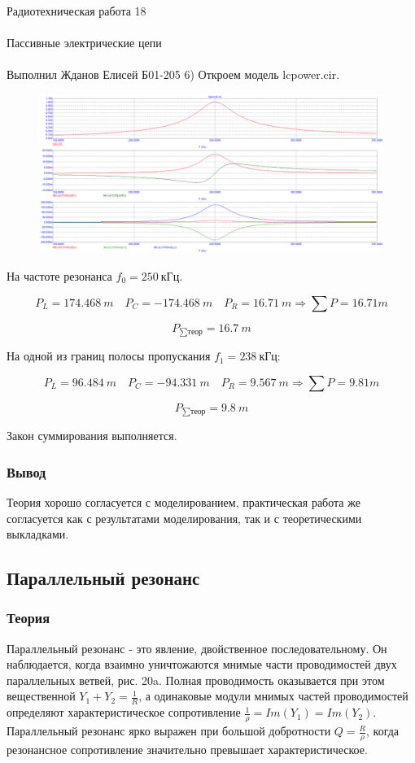 \documentclass{astroedu-lab}
\begin{document}
\begin{problem}{\huge Радиотехническая работа 18\\\\Пассивные электрические цепи\\\\Выполнил Жданов Елисей Б01-205}
6) Откроем модель lcpower.cir.

\begin{figure}[h!]
\centering
\includegraphics[scale=0.4]{lcpower.png}
\label{fig:Image1}
\end{figure} 

На частоте резонанса $f_0 = 250 \: \text{кГц}$.

\[P_L = 174.468 \: m \quad P_C = -174.468 \: m \quad P_R = 16.71 \: m \Rightarrow \sum P = 16.71 m\]

\[P_{\sum \text{теор}} = 16.7 \: m\]

На одной из границ полосы пропускания $f_1 = 238 \: \text{кГц}$:

\[P_L = 96.484 \: m \quad P_C = -94.331 \: m \quad P_R = 9.567 \: m \Rightarrow \sum P = 9.81 m\]

\[P_{\sum \text{теор}} = 9.8 \: m\]

Закон суммирования выполняется.

\subsubsection{Вывод}

Теория хорошо согласуется с моделированием, практическая работа же согласуется как с результатами моделирования, так и с теоретическими выкладками.

\subsection{Параллельный резонанс}

\subsubsection{Теория}

Параллельный резонанс - это явление, двойственное последовательному. Он наблюдается, когда взаимно уничтожаются мнимые части проводимостей двух параллельных ветвей, рис. 20a. Полная проводимость оказывается при этом вещественной $Y_1 + Y_2 = \frac{1}{R}$, а одинаковые модули мнимых частей проводимостей определяют характеристическое сопротивление $\frac{1}{\rho} = Im(Y_1) = Im(Y_2)$. Параллельный резонанс ярко выражен при большой добротности $Q = \frac{R}{\rho}$, когда резонансное сопротивление значительно превышает характеристическое.


\end{problem}
\end{document}
